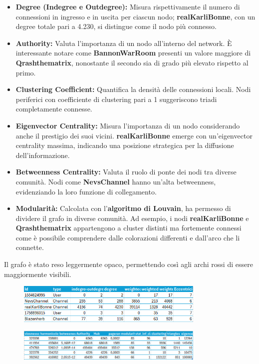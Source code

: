 \documentclass[12pt]{article}
\begin{document}
	\begin{itemize}[label=]
		\item \textbf{Degree (Indegree e Outdegree):} Misura rispettivamente il numero di connessioni in ingresso e in uscita per ciascun nodo; \textbf{realKarliBonne}, con un degree totale pari a 4.230, si distingue come il nodo più connesso.
		\item \textbf{Authority:} Valuta l'importanza di un nodo all'interno del network. È interessante notare come \textbf{BannonWarRoom} presenti un valore maggiore di \textbf{Qrashthematrix}, nonostante il secondo sia di grado più elevato rispetto al primo.
		\item \textbf{Clustering Coefficient:} Quantifica la densità delle connessioni locali. Nodi periferici con coefficiente di clustering pari a 1 suggeriscono triadi completamente connesse.
		\item \textbf{Eigenvector Centrality:} Misura l'importanza di un nodo considerando anche il prestigio dei suoi vicini. \textbf{realKarliBonne} emerge con un'eigenvector centrality massima, indicando una posizione strategica per la diffusione dell'informazione.
		\item \textbf{Betweenness Centrality:} Valuta il ruolo di ponte dei nodi tra diverse comunità. Nodi come \textbf{NevsChannel} hanno un'alta betweenness, evidenziando la loro funzione di collegamento.
		\item \textbf{Modularità:} Calcolata con l'\textbf{algoritmo di Louvain}, ha permesso di dividere il grafo in diverse comunità. Ad esempio, i nodi \textbf{realKarliBonne} e \textbf{Qrashthematrix }appartengono a cluster distinti ma fortemente connessi come è possibile comprendere dalle colorazioni differenti e dall'arco che li connette.
	\end{itemize} 
	Il grafo è stato reso leggermente opaco, permettendo così agli archi rossi di essere maggiormente visibili.\\
	\begin{figure}[H]
		\centering
		\includegraphics[width=0.8\textwidth]{immagini/tab1}
	\end{figure}
	\begin{figure}[H]
		\centering
		\includegraphics[width=0.8\textwidth]{immagini/tab2}
	\end{figure}
	\newpage
\end{document}
